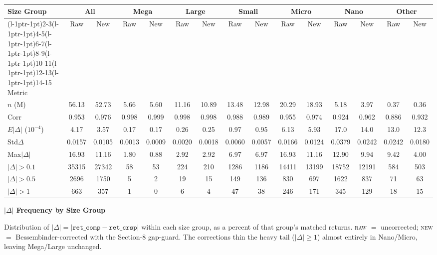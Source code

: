\documentclass[11pt]{article}
\makeatletter
\newcommand{\bigtable}[8]{%
\begin{table}[h]
\centering
\setlength{\tabcolsep}{3pt}
\renewcommand{\arraystretch}{1.5}
\small
\begin{tabular*}{\textwidth}{l
 @{\extracolsep{\fill}} c @{\extracolsep{0pt}\hspace{10pt}} c
 @{\extracolsep{\fill}} c @{\extracolsep{0pt}\hspace{10pt}} c
 @{\extracolsep{\fill}} c @{\extracolsep{0pt}\hspace{10pt}} c
 @{\extracolsep{\fill}} c @{\extracolsep{0pt}\hspace{10pt}} c
 @{\extracolsep{\fill}} c @{\extracolsep{0pt}\hspace{10pt}} c
 @{\extracolsep{\fill}} c @{\extracolsep{0pt}\hspace{10pt}} c
 @{\extracolsep{\fill}} c @{\extracolsep{0pt}\hspace{10pt}} c}
\toprule
Size Group & \multicolumn{2}{c}{All} & \multicolumn{2}{c}{Mega} & \multicolumn{2}{c}{Large}
& \multicolumn{2}{c}{Small} & \multicolumn{2}{c}{Micro} & \multicolumn{2}{c}{Nano}
& \multicolumn{2}{c}{Other} \\
\cmidrule(l{-1pt}r{-1pt}){2-3}\cmidrule(l{-1pt}r{-1pt}){4-5}\cmidrule(l{-1pt}r{-1pt}){6-7}\cmidrule(l{-1pt}r{-1pt}){8-9}\cmidrule(l{-1pt}r{-1pt}){10-11}\cmidrule(l{-1pt}r{-1pt}){12-13}\cmidrule(l{-1pt}r{-1pt}){14-15}
Metric & \multicolumn{1}{c}{Raw} & \multicolumn{1}{c}{New} & \multicolumn{1}{c}{Raw} & \multicolumn{1}{c}{New} & \multicolumn{1}{c}{Raw} & \multicolumn{1}{c}{New} & \multicolumn{1}{c}{Raw} & \multicolumn{1}{c}{New} & \multicolumn{1}{c}{Raw} & \multicolumn{1}{c}{New} & \multicolumn{1}{c}{Raw} & \multicolumn{1}{c}{New} & \multicolumn{1}{c}{Raw} & \multicolumn{1}{c}{New} \\
\midrule
#1 \\
#2 \\
#3 \\
#4 \\
#5 \\
#6 \\
#7 \\
#8 \\
\bottomrule
\end{tabular*}
\end{table}}
\makeatother
\begin{document}
\vfill

\bigtable
{$n$ (M)        & 56.13 & 52.73 & 5.66 & 5.60 & 11.16 & 10.89 & 13.48 & 12.98 & 20.29 & 18.93 & 5.18 & 3.97 & 0.37 & 0.36}
{Corr          & 0.953 & 0.976 & 0.998 & 0.999 & 0.998 & 0.998 & 0.988 & 0.989 & 0.955 & 0.974 & 0.924 & 0.962 & 0.886 & 0.932}
{$E|\Delta|$ ($10^{-4}$) & 4.17 & 3.57 & 0.17 & 0.17 & 0.26 & 0.25 & 0.97 & 0.95 & 6.13 & 5.93 & 17.0 & 14.0 & 13.0 & 12.3}
{Std$\Delta$   & 0.0157 & 0.0105 & 0.0013 & 0.0009 & 0.0020 & 0.0018 & 0.0060 & 0.0057 & 0.0166 & 0.0124 & 0.0379 & 0.0242 & 0.0242 & 0.0180}
{Max$|\Delta|$ & 16.93 & 11.16 & 1.80 & 0.88 & 2.92 & 2.92 & 6.97 & 6.97 & 16.93 & 11.16 & 12.90 & 9.94 & 9.42 & 4.00}
{$|\Delta|{>}0.1$ & 35315 & 27342 & 58 & 53 & 224 & 210 & 1286 & 1186 & 14411 & 13199 & 18752 & 12191 & 584 & 503}
{$|\Delta|{>}0.5$ & 2696 & 1750 & 5 & 2 & 19 & 15 & 149 & 136 & 830 & 697 & 1622 & 837 & 71 & 63}
{$|\Delta|{>}1$ & 663 & 357 & 1 & 0 & 6 & 4 & 47 & 38 & 246 & 171 & 345 & 129 & 18 & 15}

\vfill

\newpage

\begin{center}\Large\textbf{$|\Delta|$ Frequency by Size Group}\end{center}

\noindent
Distribution of $|\Delta| = |\texttt{ret\_comp}-\texttt{ret\_crsp}|$ within each
size group, as a percent of that group's matched returns. \textsc{raw} $=$
uncorrected; \textsc{new} $=$ Bessembinder-corrected with the Section-8
gap-guard. The corrections thin the heavy tail ($|\Delta|\ge1$) almost entirely
in Nano/Micro, leaving Mega/Large unchanged.

\vfill
\end{document}
